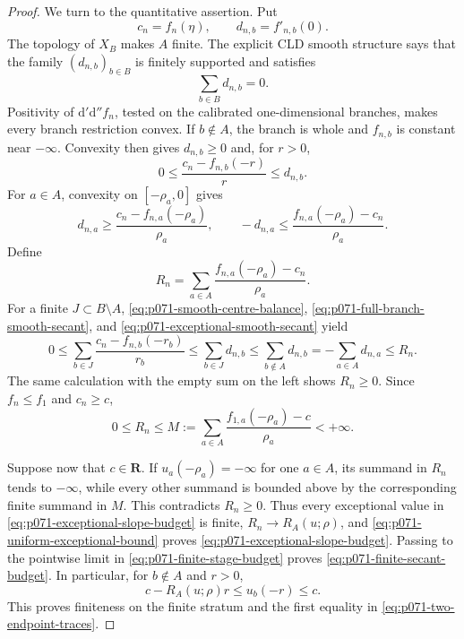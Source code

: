\begin{proof}
We turn to the quantitative assertion.  Put
\[
 c_n=f_n(\eta),
 \qquad d_{n,b}=f'_{n,b}(0).
\]
The topology of \(X_B\) makes \(A\) finite.  The explicit CLD smooth
structure says that the family \((d_{n,b})_{b\in B}\) is finitely supported
and satisfies
\begin{equation}
\label{eq:p071-smooth-centre-balance}
 \sum_{b\in B}d_{n,b}=0.
\end{equation}
Positivity of \(\mathrm d'\mathrm d''f_n\), tested on the calibrated
one-dimensional branches, makes every branch restriction convex.  If
\(b\notin A\), the branch is whole and \(f_{n,b}\) is constant near
\(-\infty\).  Convexity then gives \(d_{n,b}\geq0\) and, for \(r>0\),
\begin{equation}
\label{eq:p071-full-branch-smooth-secant}
 0\leq\frac{c_n-f_{n,b}(-r)}{r}\leq d_{n,b}.
\end{equation}
For \(a\in A\), convexity on \([-\rho_a,0]\) gives
\begin{equation}
\label{eq:p071-exceptional-smooth-secant}
 d_{n,a}\geq
 \frac{c_n-f_{n,a}(-\rho_a)}{\rho_a},
 \qquad
 -d_{n,a}\leq
 \frac{f_{n,a}(-\rho_a)-c_n}{\rho_a}.
\end{equation}
Define
\[
 R_n=\sum_{a\in A}
       \frac{f_{n,a}(-\rho_a)-c_n}{\rho_a}.
\]
For a finite \(J\subset B\setminus A\),
\eqref{eq:p071-smooth-centre-balance},
\eqref{eq:p071-full-branch-smooth-secant}, and
\eqref{eq:p071-exceptional-smooth-secant} yield
\begin{equation}
\label{eq:p071-finite-stage-budget}
 0\leq
 \sum_{b\in J}\frac{c_n-f_{n,b}(-r_b)}{r_b}
 \leq\sum_{b\in J}d_{n,b}
 \leq\sum_{b\notin A}d_{n,b}
 =-\sum_{a\in A}d_{n,a}
 \leq R_n.
\end{equation}
The same calculation with the empty sum on the left shows \(R_n\geq0\).
Since \(f_n\leq f_1\) and \(c_n\geq c\),
\begin{equation}
\label{eq:p071-uniform-exceptional-bound}
 0\leq R_n\leq
 M:=\sum_{a\in A}
       \frac{f_{1,a}(-\rho_a)-c}{\rho_a}<+\infty.
\end{equation}

Suppose now that \(c\in\mathbf R\).  If
\(u_a(-\rho_a)=-\infty\) for one \(a\in A\), its summand in \(R_n\) tends
to \(-\infty\), while every other summand is bounded above by the
corresponding finite summand in \(M\).  This contradicts \(R_n\geq0\).
Thus every exceptional value in \eqref{eq:p071-exceptional-slope-budget}
is finite, \(R_n\to R_A(u;\rho)\), and
\eqref{eq:p071-uniform-exceptional-bound} proves
\eqref{eq:p071-exceptional-slope-budget}.  Passing to the pointwise limit
in \eqref{eq:p071-finite-stage-budget} proves
\eqref{eq:p071-finite-secant-budget}.  In particular, for \(b\notin A\)
and \(r>0\),
\begin{equation}
\label{eq:p071-full-branch-two-sided-bound}
 c-R_A(u;\rho)r\leq u_b(-r)\leq c.
\end{equation}
This proves finiteness on the finite stratum and the first equality in
\eqref{eq:p071-two-endpoint-traces}.


\end{proof}

